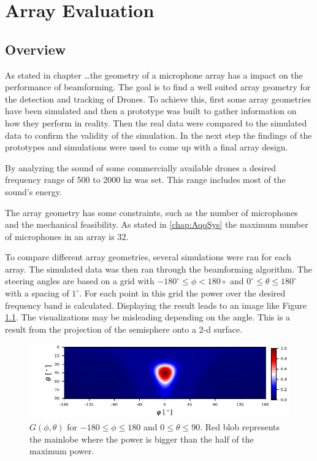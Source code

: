 \chapter{Array Evaluation}
\label{chap:aev}
\section{Overview}
As stated in chapter \dots the geometry of a microphone array
has a impact on the performance of beamforming.
The goal is to find a well suited array geometry for the detection and tracking of
Drones.
To achieve this, first some array geometries have been simulated and then
a prototype was built to gather information on how they perform in reality.
Then the real data were compared to the simulated data to
confirm the validity of the simulation.
In the next step the findings of the prototypes and simulations
were used to come up with a final array design.

By analyzing the sound of some commercially available drones
a desired frequency range of 500 to 2000 hz was set.
This range includes most of the sound's energy.

The array geometry has some constraints,
such as the number of microphones and the mechanical feasibility.
As stated in \ref*{chap:AqqSys} the maximum number of microphones
in an array is 32.

To compare different array geometries, several simulations
were ran for each array.
The simulated data was then ran through the beamforming
algorithm.
The steering angles are based on a grid with $-180^\circ \leq \phi < 180\circ$ and
$0^\circ \leq \theta \leq 180^\circ$ with a spacing of $1^\circ$.
For each point in this grid the power over the desired frequency band is calculated.
Displaying the result leads to an image like Figure \ref*{aev:fig:gridEx}.
The visualizations may be misleading depending on the angle.
This is a result from the projection of the semisphere onto a 2-d surface.
\begin{figure}
	\centering
	\includegraphics[]{images/5_array_evaluation/0.3_0.79.pdf}
	\caption{$G(\phi, \theta)$ for $-180 \leq \phi \leq 180$ and $0 \leq \theta \leq 90$.
	Red blob represents the mainlobe where the power is bigger than the half of the 
	maximum power.}
	\label{aev:fig:gridEx}
\end{figure}

